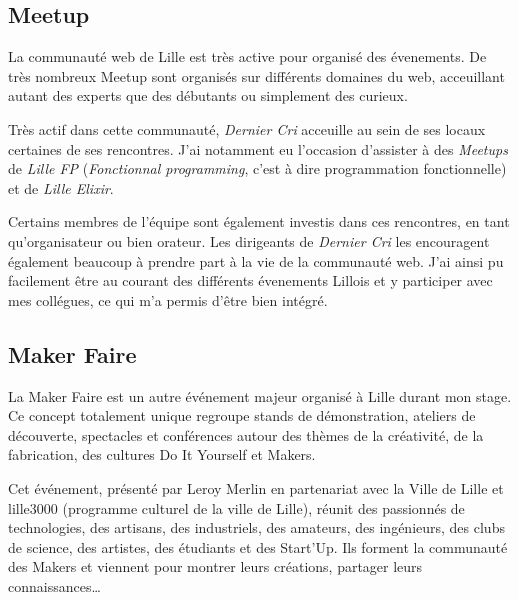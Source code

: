 \documentclass[12pt,a4paper]{article}
\begin{document}
  \bigskip

  \subsection{Meetup}\label{meetup}

  \bigskip

  La communauté web de Lille est très active pour organisé des évenements.
  De très nombreux Meetup sont organisés sur différents domaines du web,
  acceuillant autant des experts que des débutants ou simplement des
  curieux.

  \bigskip

  Très actif dans cette communauté, \emph{Dernier Cri} acceuille au sein
  de ses locaux certaines de ses rencontres. J'ai notamment eu l'occasion
  d'assister à des \emph{Meetups} de \emph{Lille FP} (\emph{Fonctionnal
  programming}, c'est à dire programmation fonctionnelle) et de
  \emph{Lille Elixir}.

  \bigskip

  Certains membres de l'équipe sont également investis dans ces
  rencontres, en tant qu'organisateur ou bien orateur. Les dirigeants de
  \emph{Dernier Cri} les encouragent également beaucoup à prendre part à
  la vie de la communauté web. J'ai ainsi pu facilement être au courant
  des différents évenements Lillois et y participer avec mes collégues, ce
  qui m'a permis d'être bien intégré.

  \bigskip

  \subsection{Maker Faire}\label{maker-faire}

  \bigskip

  La Maker Faire est un autre événement majeur organisé à Lille durant mon
  stage. Ce concept totalement unique regroupe stands de démonstration,
  ateliers de découverte, spectacles et conférences autour des thèmes de
  la créativité, de la fabrication, des cultures Do It Yourself et Makers.

  \bigskip

  Cet événement, présenté par Leroy Merlin en partenariat avec la Ville de
  Lille et lille3000 (programme culturel de la ville de Lille), réunit des
  passionnés de technologies, des artisans, des industriels, des amateurs,
  des ingénieurs, des clubs de science, des artistes, des étudiants et des
  Start'Up. Ils forment la communauté des Makers et viennent pour montrer
  leurs créations, partager leurs connaissances\ldots{}
\end{document}
